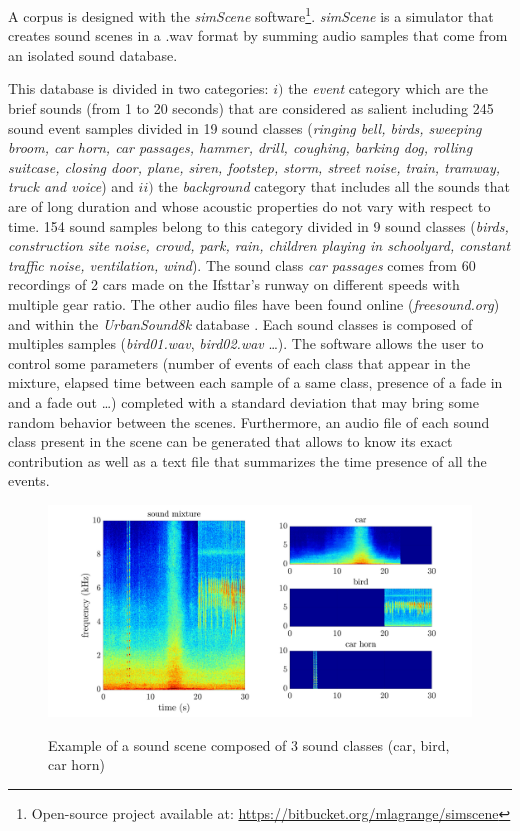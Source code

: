 \documentclass[twocolumn,a4paper,10pt]{article}
\begin{document}
A corpus is designed with the \textit{simScene} software\footnote{Open-source project available at: \url{https://bitbucket.org/mlagrange/simscene}}. \textit{simScene} \cite{rossignol_simscene:_2015} is a simulator that creates sound scenes in a .wav format by summing audio samples that come from an isolated sound database.

This database is divided in two categories: $i)$ the \textit{event} category which are the brief sounds (from 1 to 20 seconds) that are considered as salient including 245 sound event samples divided in 19 sound classes (\textit{ringing bell, birds, sweeping broom, car horn, car passages, hammer, drill, coughing, barking dog, rolling suitcase, closing door, plane, siren, footstep, storm, street noise, train, tramway, truck and voice}) and $ii)$ the \textit{background} category that includes all the sounds that are of long duration and whose acoustic properties do not vary with respect to time. 154 sound samples belong to this category divided in 9 sound classes (\textit{birds, construction site noise, crowd, park, rain, children playing in schoolyard, constant traffic noise, ventilation, wind}). The sound class \textit{car passages} comes from 60 recordings of 2 cars made on the Ifsttar's runway on different speeds with multiple gear ratio. The other audio files have been found online (\textit{freesound.org}) and within the \textit{UrbanSound8k} database \cite{salamon_dataset_nodate}. Each sound classes is composed of multiples samples (\textit{bird01.wav}, \textit{bird02.wav} \dots).
The software allows the user to control some parameters (number of events of each class that appear in the mixture, elapsed time between each sample of a same class, presence of a fade in and a fade out \dots) completed with a standard deviation that may bring some random behavior between the scenes. Furthermore, an audio file of each sound class present in the scene can be generated that allows to know its exact contribution as well as a text file that summarizes the time presence of all the events.\\

\begin{figure}[t]
\centering
\includegraphics[width=\linewidth]{figures/exampleSimScene2.pdf}
\label{fig:exampleSimScene}
\caption{Example of a sound scene composed of 3 sound classes (car, bird, car horn)}
\end{figure}
\end{document}
